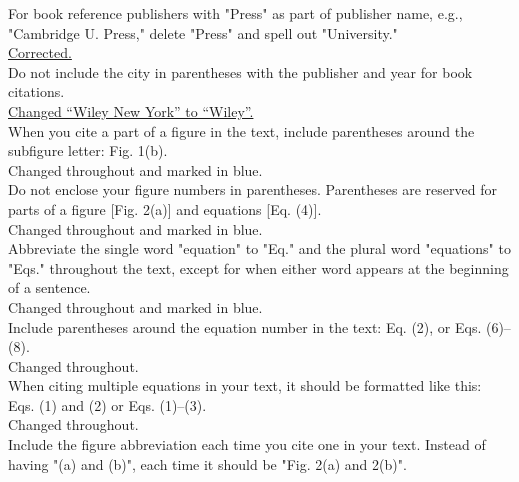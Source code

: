 \documentclass[10pt]{article}
\begin{document}
{\color{OE} For book reference publishers with "Press" as part of publisher
  name, e.g., "Cambridge U. Press," delete "Press" and spell out "University."}\\

\hyperlink{press}{\color{urlblue} Corrected.}\\

{\color{OE} Do not include the city in parentheses with the publisher and year
  for book citations.}\\

\hyperlink{wiley}{\color{urlblue} Changed ``Wiley New York'' to ``Wiley''.}\\

{\color{OE} When you cite a part of a figure in the text, include parentheses
  around the subfigure letter: Fig. 1(b).}\\

Changed throughout and marked in blue.\\

{\color{OE} Do not enclose your figure numbers in parentheses. Parentheses are
  reserved for parts of a figure [Fig. 2(a)] and equations [Eq. (4)].}\\

Changed throughout and marked in blue.\\

{\color{OE} Abbreviate the single word "equation" to "Eq." and the plural word
  "equations" to "Eqs." throughout the text, except for when either word appears
  at the beginning of a sentence.}\\

Changed throughout and marked in blue.\\

{\color{OE} Include parentheses around the equation number in the text:
  Eq. (2), or Eqs. (6)--(8).}\\

Changed throughout.\\

{\color{OE} When citing multiple equations in your text, it should be
  formatted like this: Eqs. (1) and (2) or Eqs. (1)--(3).}\\

Changed throughout.\\

{\color{OE} Include the figure abbreviation each time you cite one in your
  text. Instead of having "(a) and (b)", each time it should be "Fig. 2(a) and
  2(b)".}\\
\end{document}
